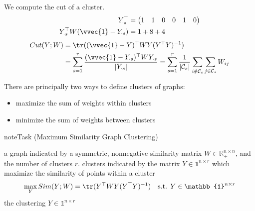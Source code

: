 \documentclass[letterpaper,10pt,english]{jupyterBook}
\begin{document}
\sphinxAtStartPar
We compute the cut of a cluster.
\begin{align*}
Y_{\cdot s}^\top&=\begin{pmatrix}
1& 1& 0& 0&1 &0
\end{pmatrix}\\
Y_{\cdot s}^\top W (\vvec{1}-Y_{\cdot s})
&= 1+8+4
\end{align*}\begin{align*}
Cut(Y;W)&=\tr((\vvec{1}-Y)^\top W Y(Y^\top Y)^{-1}) \\
&= \sum_{s=1}^r\frac{(\vvec{1}-Y_{\cdot s})^\top WY_{\cdot s}}{\lvert Y_{\cdot s}\rvert} 
= \sum_{s=1}^r\frac{1}{\lvert \mathcal{C}_s\rvert}\sum_{i\notin\mathcal{C}_s}\sum_{j\in\mathcal{C}_s}W_{ij}
\end{align*}\begin{center}\end{center}
\sphinxAtStartPar
There are principally two ways to define clusters of graphs:
\begin{itemize}
\item {} 
\sphinxAtStartPar
maximize the sum of weights within clusters

\item {} 
\sphinxAtStartPar
minimize the sum of weights between clusters

\end{itemize}

\begin{sphinxadmonition}{note}{Task (Maximum Similarity Graph Clustering)}

\sphinxAtStartPar
{} a graph indicated by a symmetric, nonnegative similarity matrix \(W\in\mathbb{R}_+^{n\times n}\), and the number of clusters \(r\). clusters indicated by the matrix \(Y\in\mathbb{1}^{n\times r}\) which maximize the similarity of points within a cluster
\begin{align*}
 \max_Y Sim(Y;W)&=\tr(Y^\top W Y(Y^\top Y)^{-1}) &\text{s.t. } Y\in\mathbb{1}^{n\times r}
\end{align*}
\sphinxAtStartPar
{} the clustering \(Y\in\mathbb{1}^{n\times r}\)
\end{sphinxadmonition}
\end{document}

